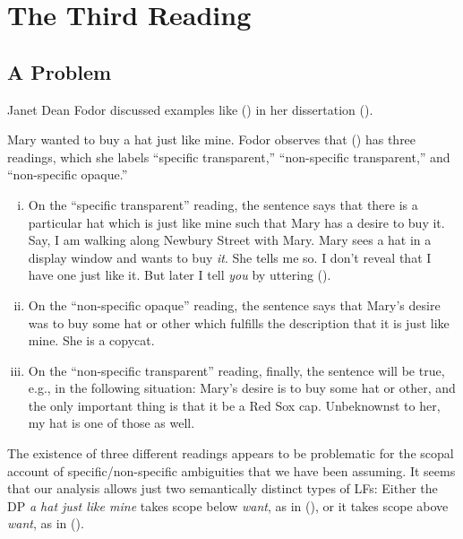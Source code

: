 \chapter{The Third Reading}\label{cha:the_third_reading} 


\minitoc

\section{A Problem}

Janet Dean Fodor discussed examples like (\nextx) in her dissertation
(\citeyear{fodor-diss}).

\ex Mary wanted to buy a hat just like mine. \xe
%
Fodor observes that (\lastx) has three readings, which she labels ``specific
transparent,'' ``non-specific transparent,'' and ``non-specific opaque.''

\begin{enumerate}[(i)] 
\item On the ``specific transparent'' reading, the sentence says that there is a
  particular hat which is just like mine such that Mary has a desire to buy it.
  Say, I am walking along Newbury Street with Mary. Mary sees a hat in a display
  window and wants to buy \emph{it}. She tells me so. I don't reveal that I have
  one just like it. But later I tell \emph{you} by uttering (\lastx).
\item On the ``non-specific opaque'' reading, the sentence says that Mary's
  desire was to buy some hat or other which fulfills the description that it is
  just like mine. She is a copycat.
\item On the ``non-specific transparent'' reading, finally, the sentence will be
  true, e.g., in the following situation: Mary's desire is to buy some hat or
  other, and the only important thing is that it be a Red Sox cap. Unbeknownst
  to her, my hat is one of those as well.
\end{enumerate}
%
The existence of three different readings appears to be problematic for the
scopal account of specific/non-specific ambiguities that we have been assuming.
It seems that our analysis allows just two semantically distinct types of LFs:
Either the DP \emph{a hat just like mine} takes scope below \emph{want}, as in
(\nextx), or it takes scope above \emph{want}, as in (\anextx).

